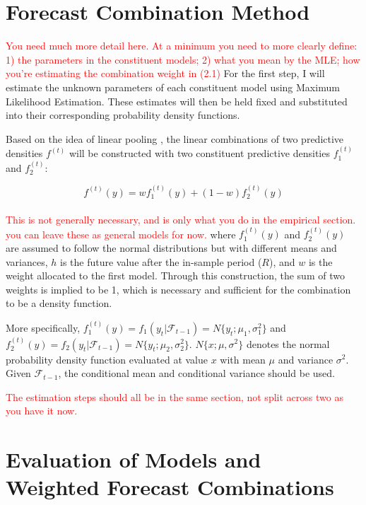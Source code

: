 \documentclass{monashthesis}
\begin{document}
\hypertarget{forecast-combination-method}{%
\section{Forecast Combination Method}\label{forecast-combination-method}}

\textcolor{red}{You need much more detail here. At a minimum you need to more clearly define: 1) the parameters in the constituent models; 2) what you mean by the MLE; how you're estimating the combination weight in (2.1)}
For the first step, I will estimate the unknown parameters of each constituent model using Maximum Likelihood Estimation. These estimates will then be held fixed and substituted into their corresponding probability density functions.

Based on the idea of linear pooling \autocite{BG69,HM07,GA11}, the linear combinations of two predictive densities \(f^{(t)}\) will be constructed with two constituent predictive densities \(f^{(t)}_1\) and \(f^{(t)}_2\):

\begin{equation}
f^{(t)}(y) = wf^{(t)}_1(y) + (1-w)f^{(t)}_2(y)
\end{equation}\\
\textcolor{red}{This is not generally necessary, and is only what you do in the empirical section. you can leave these as general models for now.}
where \(f^{(t)}_1(y)\) and \(f^{(t)}_2(y)\) are assumed to follow the normal distributions but with different means and variances, \(h\) is the future value after the in-sample period (\(R\)), and \(w\) is the weight allocated to the first model. Through this construction, the sum of two weights is implied to be 1, which is necessary and sufficient for the combination to be a density function\autocite{GA11}.

More specifically, \(f^{(t)}_1(y)=f_1(y_t|\mathcal{F}_{t-1})=N\{y_t; \mu_1, \sigma^2_1\}\) and \(f^{(t)}_2(y)=f_2(y_t|\mathcal{F}_{t-1})=N\{y_t; \mu_2, \sigma^2_2\}\). \(N\{x; \mu, \sigma^2\}\) denotes the normal probability density function evaluated at value \(x\) with mean \(\mu\) and variance \(\sigma^2\). Given \(\mathcal{F}_{t-1}\), the conditional mean and conditional variance should be used.

\textcolor{red}{The estimation steps should all be in the same section, not split across two as you have it now.}

\hypertarget{evaluation}{%
\section{Evaluation of Models and Weighted Forecast Combinations}\label{evaluation}}
\end{document}

